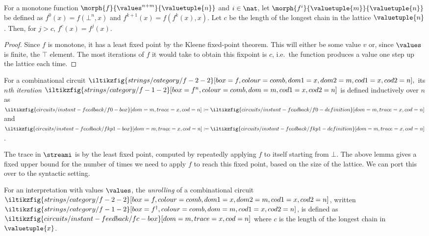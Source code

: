 \begin{lemma}\label{lem:monotone-fixpoint}
    For a monotone function \(\morph{f}{\values^{n+m}}{\valuetuple{n}}\) and
    \(i \in \nat\), let \(\morph{f^i}{\valuetuple{m}}{\valuetuple{n}}\) be
    defined as \(f^0(x)  = f(\bot^n,x)\) and \(f^{k+1}(x) = f(f^k(x), x)\).
    Let \(c\) be the length of the longest chain in the lattice
    \(\valuetuple{n}\).
    Then, for \(j > c\), \(f^c(x) = f^{j}(x)\).
\end{lemma}
\begin{proof}
    Since \(f\) is monotone, it has a least fixed point by the Kleene
    fixed-point theorem.
    This will either be some value \(v\) or, since \(\values\) is finite, the
    \(\top\) element.
    The most iterations of \(f\) it would take to obtain this fixpoint is \(c\),
    i.e.\ the function produces a value one step up the lattice each time.
\end{proof}

\begin{definition}[Iteration]\label{def:iteration}
    For a combinational circuit \(
        \iltikzfig{strings/category/f-2-2}[box=f,colour=comb,dom1=x,dom2=m,cod1=x,cod2=n],
    \)
    its \emph{\(n\)th iteration} \(
        \iltikzfig{strings/category/f-1-2}[box=f^n,colour=comb,dom=m,cod1=x,cod2=n]
    \) is defined inductively over \(n\) as \(
        \iltikzfig{circuits/instant-feedback/f0-box}[dom=m,trace=x,cod=n]
        \coloneqq
        \iltikzfig{circuits/instant-feedback/f0-definition}[dom=m,trace=x,cod=n]
    \) and \(
        \iltikzfig{circuits/instant-feedback/fkp1-box}[dom=m,trace=x,cod=n]
        \coloneqq
        \iltikzfig{circuits/instant-feedback/fkp1-definition}[dom=m,trace=x,cod=n]
    \).
\end{definition}

The trace in \(\streami\) is by the least fixed point, computed by repeatedly
applying \(f\) to itself starting from \(\bot\).
The above lemma gives a fixed upper bound for the number of times we need to
apply \(f\) to reach this fixed point, based on the size of the lattice.
We can port this over to the syntactic setting.

\begin{definition}[Unrolling]\label{def:unrolling}
    For an interpretation with values \(\values\), the \emph{unrolling}
    of a combinational circuit \(
        \iltikzfig{strings/category/f-2-2}[box=f,colour=comb,dom1=x,dom2=m,cod1=x,cod2=n]
    \), written \(
        \iltikzfig{strings/category/f-1-2}[box=f^\dagger,colour=comb,dom=m,cod1=x,cod2=n]
    \), is defined as \(
        \iltikzfig{circuits/instant-feedback/fc-box}[dom=m,trace=x,cod=n]
    \) where \(c\) is the length of the longest chain in \(\valuetuple{x}\).
\end{definition}

